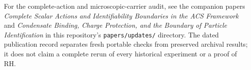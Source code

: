 \documentclass[11pt]{article}
\theoremstyle{definition}
\theoremstyle{plain}
\begin{document}
For the complete-action and microscopic-carrier audit, see the companion
papers \emph{Complete Scalar Actions and Identifiability Boundaries in the ACS
Framework} and \emph{Condensate Binding, Charge Protection, and the Boundary
of Particle Identification} in this repository's \texttt{papers/updates/}
directory. The dated publication record separates fresh portable checks
from preserved archival results; it does not claim a complete rerun of every
historical experiment or a proof of RH.
\end{document}

